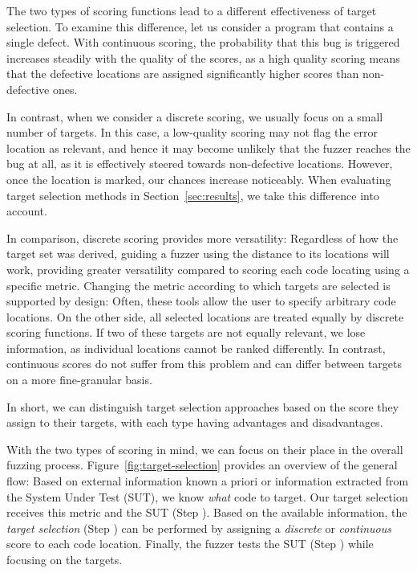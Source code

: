 The two types of scoring functions lead to a different effectiveness of target selection. To examine this difference, let us consider a program that contains a single defect. With continuous scoring, the probability that this bug is triggered increases steadily with the quality of the scores, as a high quality scoring means that the defective locations are assigned significantly higher scores than non-defective ones.

In contrast, when we consider a discrete scoring, we usually focus on a small number of targets. In this case, a low-quality scoring may not flag the error location as relevant, and hence it may become unlikely that the fuzzer reaches the bug at all, as it is effectively steered towards non-defective locations. However, once the location is marked, our chances increase noticeably.
%
When evaluating target selection methods in Section~\ref{sec:results}, we take this difference into account.

In comparison, discrete scoring provides more versatility: Regardless of how the target set was derived, guiding a fuzzer using the distance to its locations will work, providing greater versatility compared to scoring each code locating using a specific metric. Changing the metric according to which targets are selected is supported by design: Often, these tools allow the user to specify arbitrary code locations. 
%
On the other side, all selected locations are treated equally by discrete scoring functions. If two of these targets are not equally relevant, we lose information, as individual locations cannot be ranked differently.
% 
In contrast, continuous scores do not suffer from this problem and can differ between targets on a more fine-granular basis.

\medskip
In short, we can distinguish target selection approaches based on the score they assign to their targets, with each type having advantages and disadvantages.

With the two types of scoring in mind, we can focus on their place in the overall fuzzing process. Figure~\ref{fig:target-selection} provides an overview of the general flow: Based on external information known a priori or information extracted from the System Under Test (SUT), we know \emph{what} code to target. Our target selection receives this metric and the SUT (Step \stepone). Based on the available information, the \emph{target selection} (Step \steptwo) can be performed by assigning a \emph{discrete} or \emph{continuous} score to each code location. Finally, the fuzzer tests the SUT (Step \stepthree) while focusing on the targets.